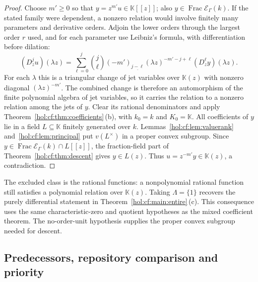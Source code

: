 \documentclass[11pt]{article}
\numberwithin{equation}{section}
\theoremstyle{definition}
\theoremstyle{remark}
\newcommand{\fall}[2]{(#1)_{\underline{#2}}}
\newcommand{\KK}{\mathbb K}
\newcommand{\EK}{\mathcal E_\Gamma(k)}
\newcommand{\FE}{\operatorname{Frac}\EK}
\begin{document}
\begin{proof}
Choose $m'\ge0$ so that $y=z^{m'}u\in\KK[[z]]$; also $y\in\FE$.
If the stated family were dependent, a nonzero relation would involve
finitely many parameters and derivative orders. Adjoin the lower orders
through the largest order $r$ used, and for each parameter use Leibniz's
formula, with differentiation before dilation:
\[
 (D_z^ju)(\lambda z)=
 \sum_{\ell=0}^j\binom j\ell\fall{-m'}{j-\ell}
 (\lambda z)^{-m'-j+\ell}(D_z^\ell y)(\lambda z).
\]
For each $\lambda$ this is a triangular change of jet variables over
$\KK(z)$ with nonzero diagonal $(\lambda z)^{-m'}$. The combined change
is therefore an automorphism of the finite polynomial algebra of jet
variables, so it carries the relation to a nonzero relation among the jets
of $y$. Clear its rational denominators and apply
Theorem~\ref{hol:cf:thm:coefficients}\,(b), with $k_0=k$ and $K_0=\KK$.
All coefficients of $y$ lie in a field $L\subseteq\KK$ finitely generated
over $k$. Lemmas~\ref{hol:cf:lem:valuerank} and~\ref{hol:cf:lem:principal}
put $v(L^\times)$ in a proper convex subgroup. Since
$y\in\FE\cap L[[z]]$, the fraction-field part of
Theorem~\ref{hol:cf:thm:descent} gives $y\in L(z)$. Thus
$u=z^{-m'}y\in\KK(z)$, a contradiction.
\end{proof}

The excluded class is the rational functions: a nonpolynomial rational
function still satisfies a polynomial relation over $\KK(z)$. Taking
$\Lambda=\{1\}$ recovers the purely differential statement in
Theorem~\ref{hol:cf:main:entire}\,(c). This consequence uses the same
characteristic-zero and quotient hypotheses as the mixed coefficient
theorem. The no-order-unit hypothesis supplies the proper convex subgroup
needed for descent.

\subsection{Predecessors, repository comparison and priority}
\label{hol:cf:sub:predecessors}
\end{document}
